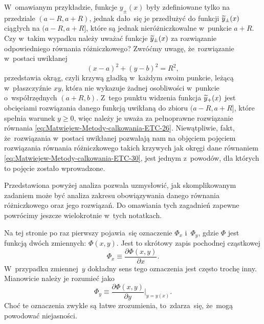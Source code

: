\documentclass[a4paper,11pt]{article}
\numberwithin{equation}{section}
\begin{document}
W~omawianym przykładzie, funkcje $y_{ \pm }( x )$ były zdefiniowane tylko na
przedziale $( a - R, a + R )$, jednak dało~się je przedłużyć do funkcji
$\widetilde{y}_{ \pm }( x )$ ciągłych na $( a - R, a + R ]$, które są jednak
nieróżniczkowalne w~punkcie $a + R$. Czy w~takim wypadku należy uważać
funkcje $\widetilde{y}_{ \pm }( x )$ za rozwiązanie odpowiedniego równania
różniczkowego? Zwróćmy uwagę, że~rozwiązanie w~postaci uwikłanej
\begin{equation}
  \label{eq:Matwiejew-Metody-calkowania-ETC-30}
  ( x - a )^{ 2 } + ( y - b )^{ 2 } = R^{ 2 },
\end{equation}
przedstawia okrąg, czyli krzywą gładką w~każdym swoim punkcie, leżącą
w~płaszczyźnie $xy$, która nie wykazuje żadnej osobliwości w~punkcie
o~współrzędnych $( a + R, b )$. Z~tego
punktu widzenia funkcja $\widetilde{y}_{ + }( x )$ jest obcięciami rozwiązania
danego funkcją uwikłaną do zbioru $( a - R, a + R ]$, które spełnia warunek
$y \geq 0$, więc należy je uważa za pełnoprawne rozwiązanie równania
\eqref{eq:Matwiejew-Metody-calkowania-ETC-26}. Niewątpliwie, fakt,
że~rozwiązania w~postaci uwikłanej pozwalają nam na objęciem pojęciem
rozwiązania równania różniczkowego takich krzywych jak okręgi dane równaniem
\eqref{eq:Matwiejew-Metody-calkowania-ETC-30}, jest jednym z~powodów, dla
których to pojęcie zostało wprowadzone.

Przedstawiona powyżej analiza pozwala uzmysłowić, jak skomplikowanym
zadaniem może być analiza zakresu obowiązywania danego równania
różniczkowego oraz jego rozwiązań. Do omawiania tych zagadnień zapewne
powrócimy jeszcze wielokrotnie w~tych notatkach.

\VerSpaceFour





\noindent
{} Na tej stronie po raz pierwszy pojawia~się oznaczenie $\Phi_{ x }$
i~$\Phi_{ y }$, gdzie $\Phi$ jest funkcją dwóch zmiennych:
$\Phi( x, y )$. Jest to skrótowy zapis pochodnej cząstkowej
\begin{equation}
  \label{eq:Czym-jest-rownanie-ETC-01}
  \Phi_{ x } \equiv
  \frac{ \partial \Phi( x, y ) }{ \partial x }.
\end{equation}
W~przypadku zmiennej~$y$ dokładny sens tego oznaczenia jest często trochę
inny. Mianowicie należy je rozumieć jako
\begin{equation}
  \label{eq:Czym-jest-rownanie-ETC-01}
  \Phi_{ y } \equiv
  \frac{ \partial \Phi( x, y ) }{ \partial y }\bigg|_{ y = y( x ) }.
\end{equation}
Choć te oznaczenia zwykle są łatwe zrozumienia, to~zdarza~się,
że~mogą powodować niejasności.
\end{document}
